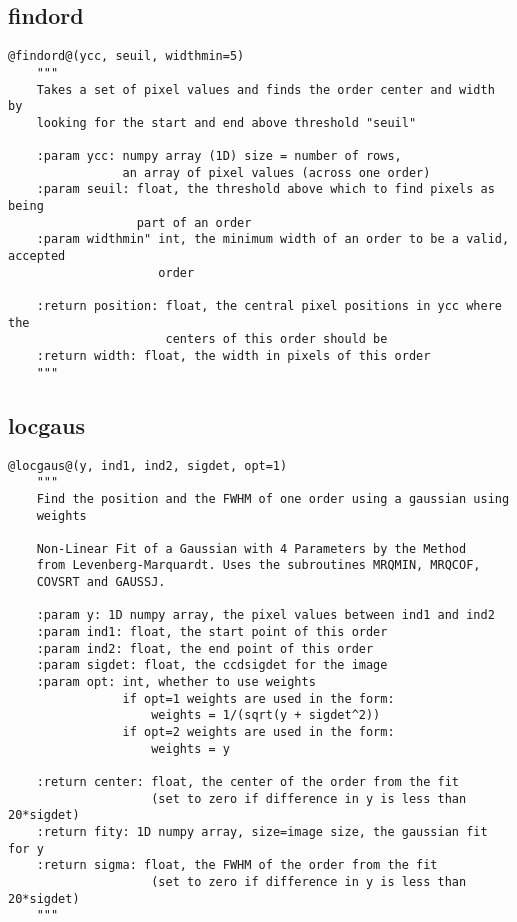 \subsection{findord}
\begin{lstlisting}[style=pythonstyle]
@findord@(ycc, seuil, widthmin=5)
    """
    Takes a set of pixel values and finds the order center and width by 
    looking for the start and end above threshold "seuil"

    :param ycc: numpy array (1D) size = number of rows,
                an array of pixel values (across one order)
    :param seuil: float, the threshold above which to find pixels as being
                  part of an order
    :param widthmin" int, the minimum width of an order to be a valid, accepted
                     order

    :return position: float, the central pixel positions in ycc where the 
                      centers of this order should be
    :return width: float, the width in pixels of this order
    """
\end{lstlisting}

\vspace{0.5cm}
\subsection{locgaus}
\begin{lstlisting}[style=pythonstyle]
@locgaus@(y, ind1, ind2, sigdet, opt=1)
    """
    Find the position and the FWHM of one order using a gaussian using
    weights

    Non-Linear Fit of a Gaussian with 4 Parameters by the Method
    from Levenberg-Marquardt. Uses the subroutines MRQMIN, MRQCOF,
    COVSRT and GAUSSJ.

    :param y: 1D numpy array, the pixel values between ind1 and ind2
    :param ind1: float, the start point of this order
    :param ind2: float, the end point of this order
    :param sigdet: float, the ccdsigdet for the image
    :param opt: int, whether to use weights
                if opt=1 weights are used in the form:
                    weights = 1/(sqrt(y + sigdet^2))
                if opt=2 weights are used in the form:
                    weights = y 
                    
    :return center: float, the center of the order from the fit 
                    (set to zero if difference in y is less than 20*sigdet)
    :return fity: 1D numpy array, size=image size, the gaussian fit for y
    :return sigma: float, the FWHM of the order from the fit
                    (set to zero if difference in y is less than 20*sigdet)
    """
\end{lstlisting}

